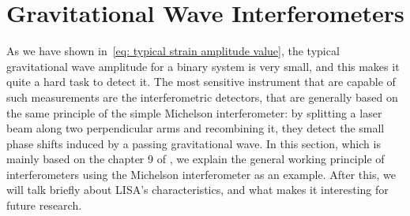 \section{Gravitational Wave Interferometers}
As we have shown in~\eqref{eq: typical strain amplitude value}, the typical gravitational wave amplitude for a binary system is very small, and this makes it quite a hard task to detect it.
The most sensitive instrument that are capable of such measurements are the interferometric detectors, that are generally based on the same principle of the simple Michelson interferometer: by splitting a laser beam along two perpendicular arms and recombining it, they detect the small phase shifts induced by a passing gravitational wave.  
In this section, which is mainly based on the chapter 9 of \cite{Maggiore}, we explain the general working principle of interferometers using the Michelson interferometer as an example.
After this, we will talk briefly about LISA's characteristics, and what makes it interesting for future research.

